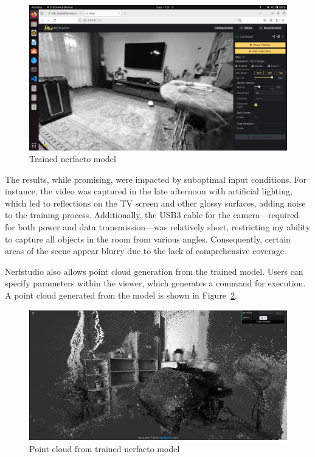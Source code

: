 \begin{figure}[htbp]
	\centering
	\includegraphics[width=150mm, keepaspectratio]{figures/trained_nerf_karcag1.png}
	\caption{Trained nerfacto model}
	\label{fig:trained_nerf_karcag}
\end{figure}

The results, while promising, were impacted by suboptimal input conditions. For instance, the video was captured in the late afternoon with artificial lighting, which led to reflections on the TV screen and other glossy surfaces, adding noise to the training process. Additionally, the USB3 cable for the camera—required for both power and data transmission—was relatively short, restricting my ability to capture all objects in the room from various angles. Consequently, certain areas of the scene appear blurry due to the lack of comprehensive coverage.

Nerfstudio also allows point cloud generation from the trained model. Users can specify parameters within the viewer, which generates a command for execution. A point cloud generated from the model is shown in Figure~\ref{fig:nerfstudio_point_cloud}.

\begin{figure}[htbp]
	\centering
	\includegraphics[width=150mm, keepaspectratio]{figures/nerfacto_point_cloud1.png}
	\caption{Point cloud from trained nerfacto model}
	\label{fig:nerfstudio_point_cloud}
\end{figure}

